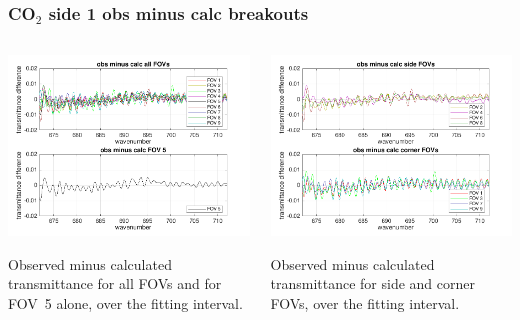 \documentclass[10pt]{beamer}
\begin{document}
\begin{frame}
\frametitle{CO$_2$ side 1 obs minus calc breakouts}
\begin{columns}[t]
\begin{column}{0.5\textwidth}
  \begin{centering}
  \includegraphics[width=\textwidth]{01-12_pfh_s1_CO2/CO2_breakout_1.png}
  \end{centering}\vspace{3mm}

Observed minus calculated transmittance for all FOVs and for FOV~5
alone, over the fitting interval.

\end{column}
\begin{column}{0.5\textwidth}  
  \begin{centering}
  \includegraphics[width=\textwidth]{01-12_pfh_s1_CO2/CO2_breakout_2.png}
  \end{centering}\vspace{3mm}

Observed minus calculated transmittance for side and corner FOVs,
over the fitting interval.

\end{column}
\end{columns}
\end{frame}
\end{document}
